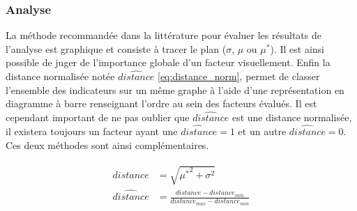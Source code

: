 \subsubsection{Analyse} %
\label{ssub:analyse}
La méthode recommandée dans la littérature pour évaluer les résultats de l’analyse
est graphique et consiste à tracer le plan ($\sigma$, $\mu$ ou $\mu^{*}$). Il est
ainsi possible de juger de l’importance globale d’un facteur visuellement.
Enfin la distance normalisée notée $\hat{distance}$ \eqref{eq:distance_norm}, permet
de classer l’ensemble des indicateurs sur un même graphe à l’aide d’une représentation
en diagramme à barre renseignant l’ordre au sein des facteurs évalués.
Il est cependant important de ne pas oublier que $\hat{distance}$ est une distance
normalisée, il existera toujours un facteur ayant une $\hat{distance} = 1$ et un autre
$\hat{distance} = 0$. Ces deux méthodes sont ainsi complémentaires.

\begin{align}\label{eq:distance_norm}
    \begin{split}
        distance        &= \sqrt{{\mu^{*}}^2 + \sigma^{2}} \\
        \hat{distance}  &=  \frac{distance - distance_{min}}{distance_{max} - distance_{min}}
    \end{split}
\end{align}







































